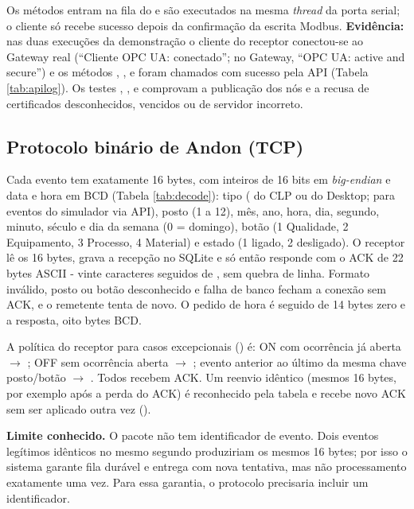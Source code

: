 Os métodos entram na fila do  e são executados na mesma \textit{thread} da porta serial; o cliente só recebe sucesso depois da confirmação da escrita Modbus. \textbf{Evidência:} nas duas execuções da demonstração o cliente do receptor conectou-se ao Gateway real (``Cliente OPC UA: conectado''; no Gateway, ``OPC UA: active and secure'') e os métodos , ,  e  foram chamados com sucesso pela API (Tabela \ref{tab:apilog}). Os testes , ,  e  comprovam a publicação dos nós e a recusa de certificados desconhecidos, vencidos ou de servidor incorreto.

\subsection{Protocolo binário de Andon (TCP)}

Cada evento tem exatamente 16 bytes, com inteiros de 16 bits em \textit{big-endian} e data e hora em BCD (Tabela \ref{tab:decode}): tipo ( do CLP ou do Desktop;  para eventos do simulador via API), posto (1 a 12), mês, ano, hora, dia, segundo, minuto, século e dia da semana (0 = domingo), botão (1 Qualidade, 2 Equipamento, 3 Processo, 4 Material) e estado (1 ligado, 2 desligado). O receptor lê os 16 bytes, grava a recepção no SQLite e só então responde com o ACK de 22 bytes ASCII - vinte caracteres  seguidos de , sem quebra de linha. Formato inválido, posto ou botão desconhecido e falha de banco fecham a conexão sem ACK, e o remetente tenta de novo. O pedido de hora é  seguido de 14 bytes zero e a resposta, oito bytes BCD.

A política do receptor para casos excepcionais () é: ON com ocorrência já aberta $\rightarrow$ ; OFF sem ocorrência aberta $\rightarrow$ ; evento anterior ao último da mesma chave posto/botão $\rightarrow$ . Todos recebem ACK. Um reenvio idêntico (mesmos 16 bytes, por exemplo após a perda do ACK) é reconhecido pela tabela  e recebe novo ACK sem ser aplicado outra vez ().

\textbf{Limite conhecido.} O pacote não tem identificador de evento. Dois eventos legítimos idênticos no mesmo segundo produziriam os mesmos 16 bytes; por isso o sistema garante fila durável e entrega com nova tentativa, mas não processamento exatamente uma vez. Para essa garantia, o protocolo precisaria incluir um identificador.
